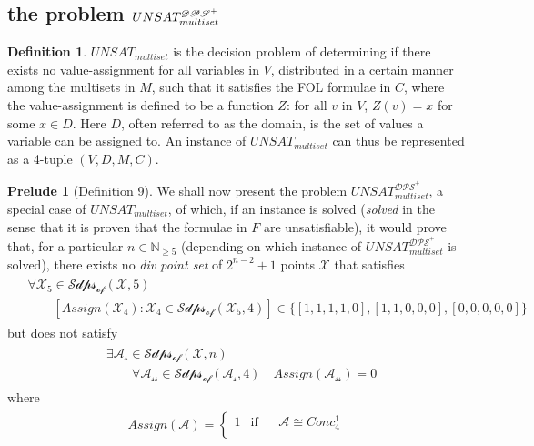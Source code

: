\documentclass[11pt, oneside]{article}      %
\theoremstyle{definition}
\newtheorem{defn}{Definition}
\numberwithin{equation}{section}
\theoremstyle{c}
\newtheorem*{prelude}{Prelude}
\begin{document}
\subsection{the problem $\color{black}UNSAT_{multiset}^{\mathscr{DPS}^+}$}
\begin{defn}$UNSAT_{multiset}$ is the decision problem of determining if there exists no value-assignment for all variables in $V$, distributed in a certain manner among the multisets in $M$, such that it satisfies the FOL formulae in $C$, where the value-assignment is defined to be a function $Z$: for all $v$ in $V$, $Z(v)= x$ for some $x \in D$. Here $D$, often referred to as the domain, is the set of values a variable can be assigned to. An instance of $UNSAT_{multiset}$ can thus be represented as a 4-tuple $(V,D,M,C)$.
\end{defn}
\begin{prelude}[Definition 9] We shall now present the problem $UNSAT_{multiset}^{\mathscr{DPS}^+}$, a special case of $UNSAT_{multiset}$, of which, if an instance is solved (\textit{solved} in the sense that it is proven that the formulae in $F$ are unsatisfiable), it would prove that, for a particular $n \in \mathbb{N}_{\geq 5}$ (depending on which instance of $UNSAT_{multiset}^{\mathscr{DPS}^+}$ is solved), there exists no \textit{div point set} of $2^{n-2}+1$ points $\mathscr{X}$ that satisfies
\begin{align}
\begin{split}\label{assign5}
&\forall \mathscr{X_5} \in \mathscr{Sdps_{of}}(\mathscr{X},5) \\
&\qquad [Assign(\mathscr{X_4}) : \mathscr{X_4} \in \mathscr{Sdps_{of}}(\mathscr{X_5},4) ] \in \{ [1,1,1,1,0], [1,1,0,0,0], [0,0,0,0,0] \}
\end{split}
\end{align}
but does not satisfy
\begin{align}
\begin{split}\label{n-conv}
& \exists \mathscr{A_s} \in \mathscr{Sdps_{of}}(\mathscr{X},n) \\
& \qquad \forall \mathscr{A_{ss}} \in \mathscr{Sdps_{of}}( \mathscr{A_s} ,4) \quad Assign(\mathscr{A_{ss}}) = 0
\end{split}
\end{align}
where
\begin{align}
\begin{split}
Assign(\mathscr{A}) =
\begin{cases}
   1 & \text{if } \;  \quad   \mathscr{A} \cong Conc_4^1  \\

\end{cases}
\end{split}
\end{align}
\end{prelude}
\end{document}
